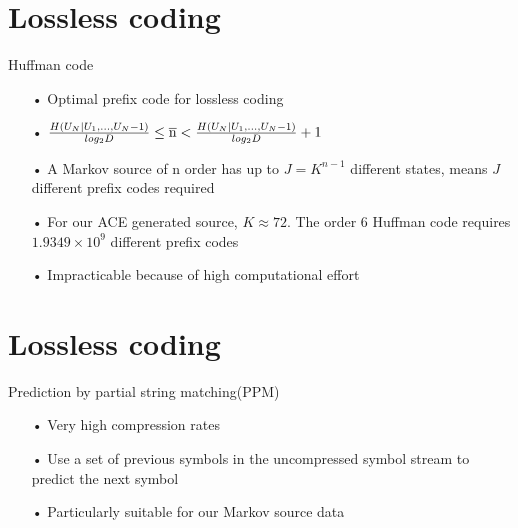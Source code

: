 \documentclass[notes=hide]{beamer}
\begin{document}
\section{Lossless coding}
\begin{frame}


   \begin{block}{Huffman code}
   	\begin{itemize}
   		\item [•] Optimal prefix code for lossless coding
   		\item [•] $\frac{H(U_N|U_1,...,U_N-1)}{log_2 D}\leq\overline{\rm n}<\frac{H(U_N|U_1,...,U_N-1)}{log_2 D}+1$
   		\item [•] A Markov source of n order has up to $J=K^{n-1}$ different states, means $J$ different prefix codes required 
   		\item [•] For our ACE generated source, $K\approx 72$. The order 6 Huffman code requires $1.9349\times10^9$ different prefix codes
   		\item [•] Impracticable because of high computational effort
   		
   	\end{itemize}
   \end{block}
\end{frame}


\newpage
\section{Lossless coding}
\begin{frame}


   \begin{block}{Prediction by partial string matching(PPM)}
   	\begin{itemize}
   		\item [•] Very high compression rates
        \item [•] Use a set of previous symbols in the uncompressed symbol stream to predict the next symbol
   		\item [•] Particularly suitable for our Markov source data
   	\end{itemize}
   \end{block}
\end{frame}


\newpage
\end{document}
